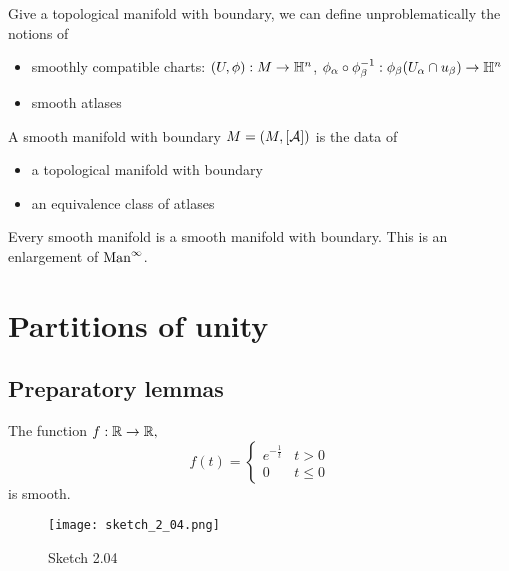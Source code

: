 Give a topological manifold with boundary, we can define unproblematically the notions of 
\begin{itemize}
    \item smoothly compatible charts: \((U,\phi):M\to\mathbb{H}^n\), \(\phi_\alpha\circ \phi_\beta^{-1}:\phi_\beta(U_\alpha\cap u_\beta)\to\mathbb{H}^n\)
    \item smooth atlases
\end{itemize}

\begin{definition*}
    A smooth manifold with boundary \(M=(M,[\mathcal{A}])\) is the data of 
    \begin{itemize}
        \item a topological manifold with boundary 
        \item an equivalence class of atlases 
    \end{itemize}    
\end{definition*}

\begin{remark}
    Every smooth manifold is a smooth manifold with boundary. This is an enlargement of 
    \(\text{Man}^\infty\).
\end{remark}

\section{Partitions of unity}

\subsection{Preparatory lemmas}

\begin{lemma}\label{lem:2.4}
    The function \(f:\mathbb{R}\to\mathbb{R},\)
    \[f(t)=\begin{cases}
        e^{-\frac{1}{t}} & t>0\\
        0 & t\leq 0
    \end{cases}\]
    is smooth.
\end{lemma}

\begin{figure}[H]
    \centering
    \texttt{[image: sketch\_2\_04.png]}
    \caption{Sketch 2.04}
\end{figure}

